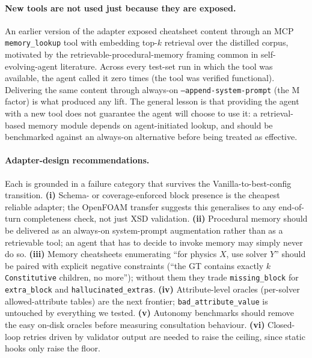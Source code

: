 \documentclass{article}
\begin{document}
\paragraph{New tools are not used just because they are exposed.} An earlier version of the adapter exposed cheatsheet content through an MCP \texttt{memory\_lookup} tool with embedding top-$k$ retrieval over the distilled corpus, motivated by the retrievable-procedural-memory framing common in self-evolving-agent literature. Across every test-set run in which the tool was available, the agent called it zero times (the tool was verified functional). Delivering the same content through always-on \texttt{--append-system-prompt} (the M factor) is what produced any lift. The general lesson is that providing the agent with a new tool does not guarantee the agent will choose to use it: a retrieval-based memory module depends on agent-initiated lookup, and should be benchmarked against an always-on alternative before being treated as effective.

\paragraph{Adapter-design recommendations.} Each is grounded in a failure category that survives the Vanilla-to-best-config transition. \textbf{(i)} Schema- or coverage-enforced block presence is the cheapest reliable adapter; the OpenFOAM transfer suggests this generalises to any end-of-turn completeness check, not just XSD validation. \textbf{(ii)} Procedural memory should be delivered as an always-on system-prompt augmentation rather than as a retrievable tool; an agent that has to decide to invoke memory may simply never do so. \textbf{(iii)} Memory cheatsheets enumerating ``for physics $X$, use solver $Y$'' should be paired with explicit negative constraints (``the GT contains exactly $k$ \texttt{Constitutive} children, no more''); without them they trade \texttt{missing\_block} for \texttt{extra\_block} and \texttt{hallucinated\_extras}. \textbf{(iv)} Attribute-level oracles (per-solver allowed-attribute tables) are the next frontier; \texttt{bad\_attribute\_value} is untouched by everything we tested. \textbf{(v)} Autonomy benchmarks should remove the easy on-disk oracles before measuring consultation behaviour. \textbf{(vi)} Closed-loop retries driven by validator output are needed to raise the ceiling, since static hooks only raise the floor.
\end{document}

